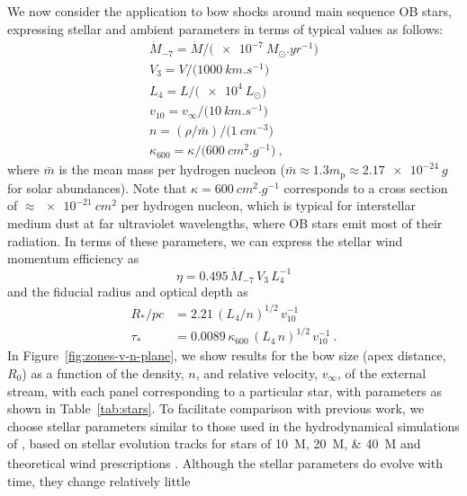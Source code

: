 We now consider the application to bow shocks around main sequence OB
stars, expressing stellar and ambient parameters in terms of typical
values as follows:
\begin{gather*}
  \label{eq:stellar-parameters}
  \dot{M}_{-7} = \dot{M} / \bigl(\SI{e-7}{M_\odot.yr^{-1}}\bigr) \\
  V_3 = V / \bigl(\SI{1000}{km.s^{-1}}\bigr) \\
  L_4 = L / \bigl(\SI{e4}{L_\odot}\bigr) \\
  v_{10} = v_\infty / \bigl( \SI{10}{km.s^{-1}} \bigr) \\
  n = (\rho / \bar{m}) / \bigl( \SI{1}{cm^{-3}} \bigr) \\
  \kappa_{600} = \kappa / \bigl( \SI{600}{cm^2.g^{-1}} \bigr) \ ,
\end{gather*}
where \(\bar{m}\) is the mean mass per hydrogen nucleon
(\(\bar{m} \approx 1.3 m_{\text{p}} \approx \SI{2.17e-24}{g}\) for solar
abundances).  Note that \(\kappa = \SI{600}{cm^2.g^{-1}}\) corresponds to a
cross section of \(\approx \SI{e-21}{cm^2}\) per hydrogen nucleon, which is
typical for interstellar medium dust \citep{Bertoldi:1996a} at far
ultraviolet wavelengths, where OB stars emit most of their radiation.
In terms of these parameters, we can express the stellar wind momentum
efficiency as
\begin{equation}
  \label{eq:wind-eta-typical}
  \eta = \num{0.495} \,\dot{M}_{-7} \,V_3  \,L_4^{-1}
\end{equation}
and the fiducial radius and optical depth as
\begin{align}
  \label{eq:fiducial-typical}
  R_* / \si{pc} &= \num{2.21} \, (L_4 / n)^{1/2} \,v_{10}^{-1} \\
  \tau_* &= \num{0.0089} \,\kappa_{600} \, (L_4 \,n)^{1/2} \,v_{10}^{-1} \ .
\end{align}
In Figure~\ref{fig:zones-v-n-plane}, we show results for the bow size
(apex distance, \(R_0\)) as a function of the density, \(n\), and
relative velocity, \(v_\infty\), of the external stream, with each panel
corresponding to a particular star, with parameters as shown in
Table~\ref{tab:stars}.  To facilitate comparison with previous work,
we choose stellar parameters similar to those used in the
hydrodynamical simulations of \citet{Meyer:2014b, Meyer:2016a,
  Meyer:2017a}, based on stellar evolution tracks for stars of
\SIlist{10;20;40}{M_\odot} \citep{Brott:2011a} and theoretical wind
prescriptions \citep{de-Jager:1988a, Vink:2000a}.  Although the
stellar parameters do evolve with time, they change relatively little
